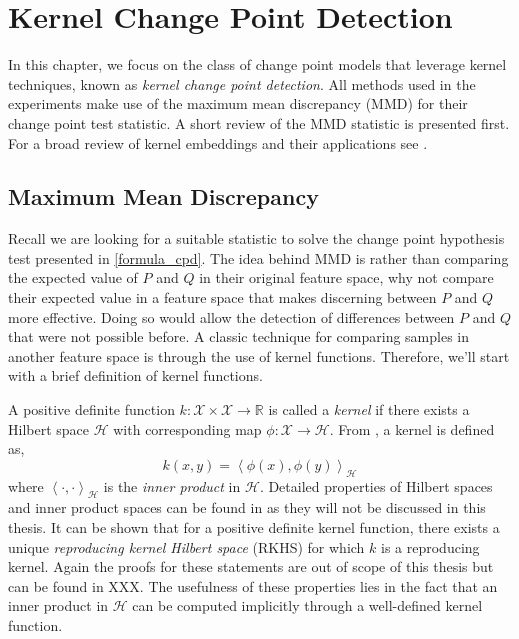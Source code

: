 \chapter{Kernel Change Point Detection}
In this chapter, we focus on the class of change point models that leverage kernel techniques, known as \textit{kernel change point detection}. All methods used in the experiments make use of the maximum mean discrepancy (MMD) for their change point test statistic. A short review of the MMD statistic is presented first. For a broad review of kernel embeddings and their applications see \cite{muandet2017kernel} .

\section{Maximum Mean Discrepancy}
\label{mmd}
Recall we are looking for a suitable statistic to solve the change point hypothesis test presented in \ref{formula_cpd}. The idea behind MMD is rather than comparing the expected value of $P$ and $Q$ in their original feature space, why not compare their expected value in a feature space that makes discerning between $P$ and $Q$ more effective.  Doing so would allow the detection of differences between $P$ and $Q$ that were not possible before. A classic technique for comparing samples in another feature space is through the use of kernel functions. Therefore, we'll start with a brief definition of kernel functions.

A positive definite function $k: \mathcal{X} \times \mathcal{X} \rightarrow \mathbb{R}$ is called a \textit{kernel} if there exists a Hilbert space $ \mathcal{H}$ with corresponding map $\phi: \mathcal{X} \rightarrow \mathcal{H}$. From \cite{scholkopf2002learning}, a kernel is defined as,
\begin{equation}
\label{kernel}
k(x,y) = \left\langle \phi(x), \phi(y) \right\rangle_\mathcal{H}
\end{equation}
where $\left\langle \cdot, \cdot \right\rangle_\mathcal{H}$ is the \textit{inner product} in $ \mathcal{H}$. Detailed properties of Hilbert spaces and inner product spaces can be found in \cite{young1988introduction} as they will not be discussed in this thesis.  It can be shown that for a positive definite kernel function, there exists a unique \textit{reproducing kernel Hilbert space} (RKHS) for which $k$ is a reproducing kernel. Again the proofs for these statements are out of scope of this thesis but can be found in XXX. The usefulness of these properties lies in the fact that an inner product in $ \mathcal{H}$ can be computed implicitly through a well-defined kernel function.

